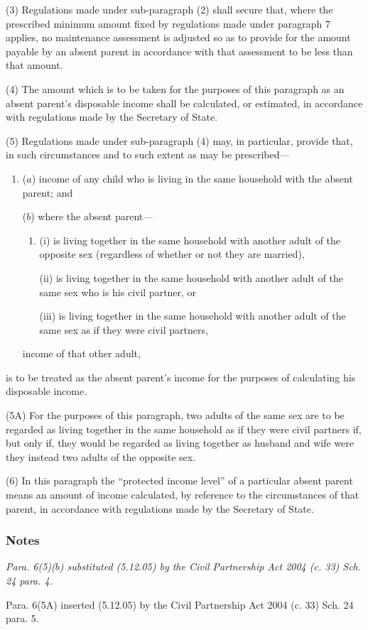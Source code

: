 \documentclass[a4paper]{article}
\newcommand\amendment[1]{\subsubsection*{Notes}{\itshape\frenchspacing\footnotesize #1 \par}}
\begin{document}
{(3) Regulations made under sub-paragraph (2) shall secure that, where the prescribed minimum amount fixed by regulations made under paragraph 7 applies, no maintenance assessment is adjusted so as to provide for the amount payable by an absent parent in accordance with that assessment to be less than that amount.

(4) The amount which is to be taken for the purposes of this paragraph as an absent parent’s disposable income shall be calculated, or estimated, in accordance with regulations made by the Secretary of State.

(5) Regulations made under sub-paragraph (4) may, in particular, provide that, in such circumstances and to such extent as may be prescribed---
\begin{enumerate}\item[]
($a$) income of any child who is living in the same household with the absent parent; and

($b$) where the absent parent---
\begin{enumerate}\item[]
(i)
is living together in the same household with another adult of the
opposite sex (regardless of whether or not they are married),

(ii)
is living together in the same household with another adult of the same
sex who is his civil partner, or

(iii) is living together in the same household with another adult of the same
sex as if they were civil partners,
\end{enumerate}
income of that other adult,
\end{enumerate}
is to be treated as the absent parent’s income for the purposes of calculating his disposable income.

(5A) For the purposes of this paragraph, two adults of the same sex are to be regarded as living together in the same household as if they were civil partners if, but only if, they would be regarded as living together as husband and wife were they instead two adults of the opposite sex.

(6) In this paragraph the “protected income level” of a particular absent parent means an amount of income calculated, by reference to the circumstances of that parent, in accordance with regulations made by the Secretary of State.

\amendment{
Para. 6(5)($b$) substituted (5.12.05) by the Civil Partnership Act 2004 (c. 33) Sch. 24 para. 4.

Para. 6(5A) inserted (5.12.05) by the Civil Partnership Act 2004 (c. 33) Sch. 24 para. 5.
}

}
\end{document}
